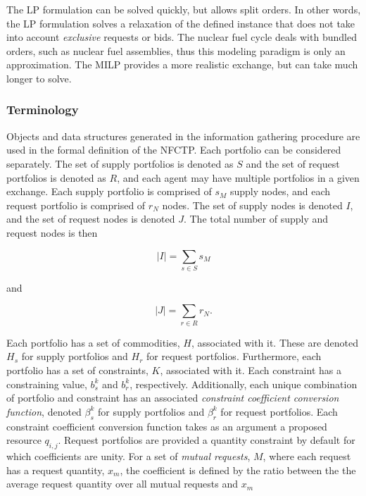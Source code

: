 The LP formulation can be solved quickly, but allows split orders. In other
words, the LP formulation solves a relaxation of the defined instance that does
not take into account \textit{exclusive} requests or bids. The nuclear fuel
cycle deals with bundled orders, such as nuclear fuel assemblies, thus this
modeling paradigm is only an approximation. The MILP provides a more realistic
exchange, but can take much longer to solve. 

\subsubsection{Terminology}

Objects and data structures generated in the information gathering procedure are
used in the formal definition of the NFCTP. Each portfolio can be considered
separately. The set of supply portfolios is denoted as $S$ and the set of
request portfolios is denoted as $R$, and each agent may have multiple
portfolios in a given exchange. Each supply portfolio is comprised of $s_M$
supply nodes, and each request portfolio is comprised of $r_N$ nodes. The set of
supply nodes is denoted $I$, and the set of request nodes is denoted $J$. The
total number of supply and request nodes is then

\begin{equation}
  \left|{I}\right| = \sum_{s \in S} s_M
\end{equation}

and

\begin{equation}
  \left|{J}\right| = \sum_{r \in R} r_N.
\end{equation}

Each portfolio has a set of commodities, $H$, associated with it. These are
denoted $H_s$ for supply portfolios and $H_r$ for request
portfolios. Furthermore, each portfolio has a set of constraints, $K$,
associated with it. Each constraint has a constraining value, $b_s^k$ and
$b_r^k$, respectively. Additionally, each unique combination of portfolio and
constraint has an associated \textit{constraint coefficient conversion
  function}, denoted $\beta_s^k$ for supply portfolios and $\beta_r^k$ for
request portfolios. Each constraint coefficient conversion function takes as an
argument a proposed resource $q_{i,j}$. Request portfolios are provided a
quantity constraint by default for which coefficients are unity. For a set of
\textit{mutual requests}, $M$, where each request has a request quantity, $x_m$,
the coefficient is defined by the ratio between the the average request quantity
over all mutual requests and $x_m$

